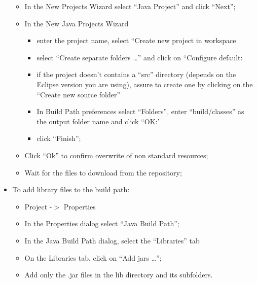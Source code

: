 \begin{itemize}
\begin{itemize}
	\item In the New Projects Wizard select \textquotedblleft{}Java
Project\textquotedblright{} and click
\textquotedblleft{}Next\textquotedblright{};
	\item In the New Java Projects Wizard
\begin{itemize}
	\item enter the project name, select \textquotedblleft{}Create new project
in workspace
	\item select \textquotedblleft{}Create separate folders
\ldots{}\textquotedblright{} and click on \textquotedblleft{}Configure
default:
	\item if the project doesn't contains a \textquotedblleft{}src\textquotedblright{} directory (depends on the Eclipse version you are using), assure to create one by
		clicking on the \textquotedblleft{}Create new source folder\textquotedblright{}
	\item In Build Path preferences select
\textquotedblleft{}Folders\textquotedblright{}, enter
\textquotedblleft{}build/classes\textquotedblright{} as the output
folder name and click \textquotedblleft{}OK:'
	\item click \textquotedblleft{}Finish\textquotedblright{};
\end{itemize}

	\item Click \textquotedblleft{}Ok\textquotedblright{} to confirm overwrite
of non standard resources;
	\item Wait for the files to download from the repository;
\end{itemize}

	\item To add library files to the build path:
\begin{itemize}
	\item Project -\begin{math}>\end{math} Properties
	\item In the Properties dialog select \textquotedblleft{}Java Build
Path\textquotedblright{};
	\item In the Java Build Path dialog, select the
\textquotedblleft{}Libraries\textquotedblright{} tab
	\item On the Libraries tab, click on \textquotedblleft{}Add jars
\ldots{}\textquotedblright{};
	\item Add only the .jar files in the lib directory and its subfolders.
\end{itemize}

\end{itemize}

